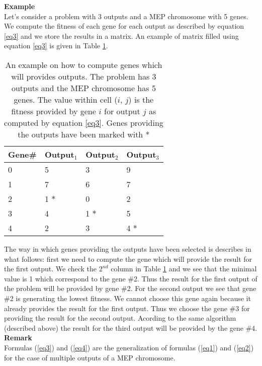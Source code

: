 \documentclass [11pt]{article}
\begin{document}
\textbf{Example}\\

Let's consider a problem with 3 outputs and a MEP chromosome with 5 genes. We compute the fitness of each gene for each output as described by equation \ref{eq3} and we store the results in a matrix. An example of matrix filled using equation \ref{eq3} is given in Table \ref{mep_multi_outputs_matrix}.

\begin{table}
\caption{An example on how to compute genes which will provides outputs. The problem has 3 outputs and the MEP chromosome has 5 genes. The value within cell ($i$, $j$) is the fitness provided by gene $i$ for output $j$ as computed by equation \ref{eq3}. Genes providing the outputs have been marked with *}
\label{mep_multi_outputs_matrix}
\begin{center}
\begin{tabular}
{|p{30pt}|p{40pt}|p{40pt}|p{40pt}|}
\hline
Gene\#& 
Output$_{1}$&
Output$_{2}$&
Output$_{3}$ \\
\hline
0&
5&
3&
9\\
\hline
1&
7&
6&
7\\
\hline
2&
1 $*$&
0&
2\\
\hline
3&
4&
1 $*$&
5\\
\hline
4&
2&
3&
4 $*$\\
\hline
\end{tabular}
\end{center}
\end{table}

The way in which genes providing the outputs have been selected is describes in what follows: first we need to compute the gene which will provide the result for the first output. We check the $2^{nd}$ column in Table \ref{mep_multi_outputs_matrix} and we see that the minimal value is  1 which correspond to the gene \#2. Thus the result for the first output of the problem will be provided by gene \#2. For the second output we see that gene \#2 is generating the lowest fitness. We cannot choose this gene again because it already provides the result for the first output. Thus we choose the gene \#3 for providing the result for the second output. Acording to the same algorithm (described above) the result for the third output will be provided by the gene \#4.\\

\textbf{Remark}\\

Formulas (\ref{eq3}) and (\ref{eq4}) are the generalization of formulas (\ref{eq1}) and (\ref{eq2}) for the case of multiple outputs of a MEP chromosome.
\end{document}
